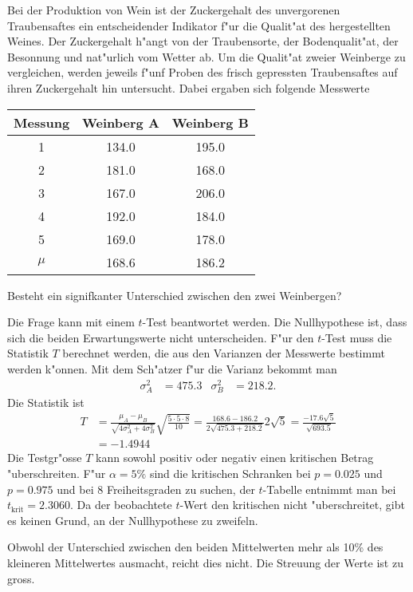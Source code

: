 Bei der Produktion von Wein ist der Zuckergehalt des unvergorenen
Traubensaftes ein entscheidender Indikator f"ur die Qualit"at des
hergestellten Weines. Der Zuckergehalt h"angt von der Traubensorte,
der Bodenqualit"at, der Besonnung und nat"urlich vom Wetter ab.
Um die Qualit"at zweier Weinberge zu vergleichen, werden jeweils
f"unf Proben
des frisch gepressten Traubensaftes auf ihren Zuckergehalt hin
untersucht. Dabei ergaben sich folgende Messwerte

\begin{center}
\begin{tabular}{|c|cc|}
\hline
Messung&Weinberg A&Weinberg B\\
\hline
1&134.0&195.0\\
2&181.0&168.0\\
3&167.0&206.0\\
4&192.0&184.0\\
5&169.0&178.0\\
\hline
$\mu$ &168.6&186.2\\
\hline
\end{tabular}
\end{center}
Besteht ein signifkanter Unterschied zwischen den zwei Weinbergen?

\begin{loesung}
Die Frage kann mit einem $t$-Test beantwortet werden.
Die Nullhypothese ist, dass sich die beiden Erwartungswerte
nicht unterscheiden. F"ur den $t$-Test muss die Statistik $T$
berechnet werden, die aus den Varianzen der Messwerte 
bestimmt werden k"onnen. Mit dem Sch"atzer f"ur die Varianz
bekommt man
\begin{align*}
\sigma_A^2&=475.3&
\sigma_B^2&=218.2.
\end{align*}
Die Statistik ist
\begin{align*}
T&=\frac{\mu_A-\mu_B}{\sqrt{4\sigma_A^2+4\sigma_B^2}}\sqrt{\frac{5\cdot5\cdot 8}{10}}
=\frac{168.6-186.2}{2\sqrt{475.3+218.2}}2\sqrt{5}
=\frac{-17.6\sqrt{5}}{\sqrt{693.5}}
\\
&=-1.4944
\end{align*}
Die Testgr"osse $T$ kann sowohl positiv oder negativ einen kritischen
Betrag "uberschreiten.
F"ur $\alpha=5\%$ sind die kritischen Schranken bei $p=0.025$ und $p=0.975$
und bei $8$ Freiheitsgraden zu suchen, der $t$-Tabelle entnimmt man
bei $t_{\text{krit}}=2.3060$. Da der beobachtete $t$-Wert den kritischen
nicht "uberschreitet, gibt es keinen Grund, an der Nullhypothese
zu zweifeln.

Obwohl der Unterschied zwischen den beiden Mittelwerten mehr als 10\%
des kleineren Mittelwertes ausmacht, reicht dies nicht. Die Streuung
der Werte ist zu gross.
\end{loesung}
